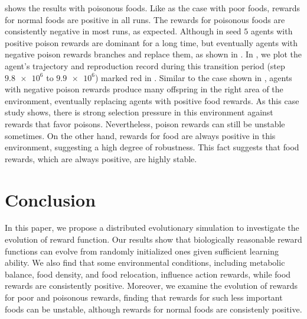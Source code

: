  shows the results with poisonous foods. Like as the case with poor foods, rewards for normal foods are positive in all runs. The rewards for poisonous foods are consistently negative in most runs, as expected. Although in seed $5$ agents with positive poison rewards are dominant for a long time, but eventually agents with negative poison rewards branches and replace them, as shown in . In , we plot the agent's trajectory and reproduction record during this transition period (step $\num{9.8e6}$ to $\num{9.9e6}$) marked red in . Similar to the case shown in , agents with negative poison rewards produce many offspring in the right area of the environment, eventually replacing agents with positive food rewards. As this case study shows, there is strong selection pressure in this environment against rewards that favor poisons. Nevertheless, poison rewards can still be unstable sometimes. On the other hand, rewards for food are always positive in this environment, suggesting a high degree of robustness. This fact suggests that food rewards, which are always positive, are highly stable.

\section{Conclusion}
In this paper, we propose a distributed evolutionary simulation to investigate the evolution of reward function.
Our results show that biologically reasonable reward functions can evolve from randomly initialized ones given sufficient learning ability.
We also find that some environmental conditions, including metabolic balance, food density, and food relocation, influence action rewards, while food rewards are consistently positive.
Moreover, we examine the evolution of rewards for poor and poisonous rewards, finding that rewards for such less important foods can be unstable, although rewards for normal foods are consistenly positive.
